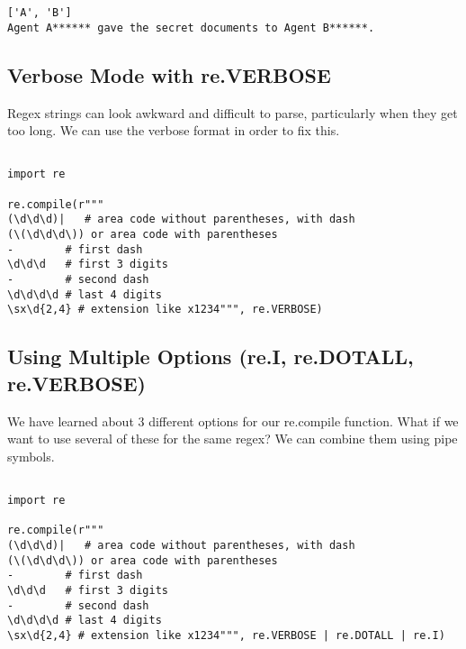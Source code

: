 \documentclass[11pt]{article}
\begin{document}
\begin{verbatim}
['A', 'B']
Agent A****** gave the secret documents to Agent B******.
\end{verbatim}

\subsection{Verbose Mode with re.VERBOSE}
\label{sec:org2af474c}

Regex strings can look awkward and difficult to parse, particularly when they get too long. We can use the verbose format in order to fix this.

\begin{verbatim}

import re

re.compile(r"""
(\d\d\d)|   # area code without parentheses, with dash
(\(\d\d\d\)) or area code with parentheses
-        # first dash
\d\d\d   # first 3 digits
-        # second dash
\d\d\d\d # last 4 digits
\sx\d{2,4} # extension like x1234""", re.VERBOSE)

\end{verbatim}

\subsection{Using Multiple Options (re.I, re.DOTALL, re.VERBOSE)}
\label{sec:org78cbe6d}

We have learned about 3 different options for our re.compile function. What if we want to use several of these for the same regex? We can combine them using pipe symbols.

\begin{verbatim}

import re

re.compile(r"""
(\d\d\d)|   # area code without parentheses, with dash
(\(\d\d\d\)) or area code with parentheses
-        # first dash
\d\d\d   # first 3 digits
-        # second dash
\d\d\d\d # last 4 digits
\sx\d{2,4} # extension like x1234""", re.VERBOSE | re.DOTALL | re.I)

\end{verbatim}
\end{document}
